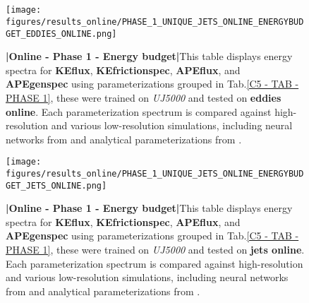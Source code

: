 \part{}
\newpage

%
%
\begin{figure}[H]
    \centering
    \texttt{[image: figures/results\_online/PHASE\_1\_UNIQUE\_JETS\_ONLINE\_ENERGYBUDGET\_EDDIES\_ONLINE.png]}
    \caption{\textbf{|}\textcolor{section_color}{\textbf{Online - Phase 1 - Energy budget}}\textbf{|}This table displays energy spectra for \textbf{KEflux}, \textbf{KEfrictionspec}, \textbf{APEflux}, and \textbf{APEgenspec} using parameterizations grouped in Tab.\ref{C5 - TAB - PHASE 1}, these were trained on \textit{UJ5000} and tested on \textbf{eddies online}. Each parameterization spectrum is compared against high-resolution and various low-resolution simulations, including neural networks from \cite{Benchmarking} and analytical parameterizations from \cite{ClosureAnalytical2, ClosureAnalytical51, ClosureDataDrivenZanna}.
}
    \label{APP - ONLINE - PHASE 1 - ENERGY BUDGET -  JETS UNIQUE 5000 and EDDIES ONLINE}
\end{figure}

\newpage


\begin{figure}[H]
    \centering
    \texttt{[image: figures/results\_online/PHASE\_1\_UNIQUE\_JETS\_ONLINE\_ENERGYBUDGET\_JETS\_ONLINE.png]}
    \caption{\textbf{|}\textcolor{section_color}{\textbf{Online - Phase 1 - Energy budget}}\textbf{|}This table displays energy spectra for \textbf{KEflux}, \textbf{KEfrictionspec}, \textbf{APEflux}, and \textbf{APEgenspec} using parameterizations grouped in Tab.\ref{C5 - TAB - PHASE 1}, these were trained on \textit{UJ5000} and tested on \textbf{jets online}. Each parameterization spectrum is compared against high-resolution and various low-resolution simulations, including neural networks from \cite{Benchmarking} and analytical parameterizations from \cite{ClosureAnalytical2, ClosureAnalytical51, ClosureDataDrivenZanna}.
}
    \label{APP - ONLINE - PHASE 1 - ENERGY BUDGET -  JETS UNIQUE 5000 and JETS ONLINE}
\end{figure}


